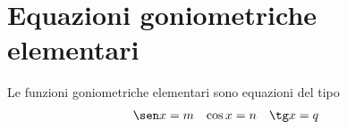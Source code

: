%
\section{Equazioni goniometriche elementari}
\label{sec:EquazioniGoniometricheElementari}
Le funzioni goniometriche elementari sono equazioni del tipo
\begin{align*}
	\sen x&=m&\cos x&=n&\tg x&=q
\end{align*}
